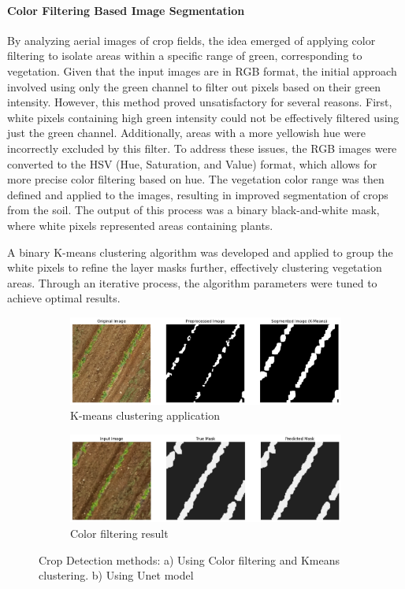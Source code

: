\documentclass[conference]{IEEEtran}
\begin{document}
\paragraph{Color Filtering Based Image Segmentation}
By analyzing aerial images of crop fields, the idea emerged of applying color filtering to isolate areas within a specific range of green, corresponding to vegetation. Given that the input images are in RGB format, the initial approach involved using only the green channel to filter out pixels based on their green intensity. However, this method proved unsatisfactory for several reasons. First, white pixels containing high green intensity could not be effectively filtered using just the green channel. Additionally, areas with a more yellowish hue were incorrectly excluded by this filter. To address these issues, the RGB images were converted to the HSV (Hue, Saturation, and Value) format, which allows for more precise color filtering based on hue. The vegetation color range was then defined and applied to the images, resulting in improved segmentation of crops from the soil. The output of this process was a binary black-and-white mask, where white pixels represented areas containing plants.

A binary K-means clustering algorithm was developed and applied to group the white pixels to refine the layer masks further, effectively clustering vegetation areas. Through an iterative process, the algorithm parameters were tuned to achieve optimal results.

\begin{figure}[htbp]
    \centering
    \begin{subfigure}[b]{0.45\textwidth}
        \centering
        \includegraphics[width=\linewidth]{Kmeans.png}
        \caption{K-means clustering application}
        \label{fig:kmeans}
    \end{subfigure}\hfill
    \begin{subfigure}[b]{0.45\textwidth}
        \centering
        \includegraphics[width=\linewidth]{Dryoutputgrass.png}
        \caption{Color filtering result}
        \label{fig:filtering}
    \end{subfigure}
    \caption{Crop Detection methods: a) Using Color filtering and Kmeans clustering. b) Using Unet model}
    \label{fig:combined}
\end{figure}
\end{document}
